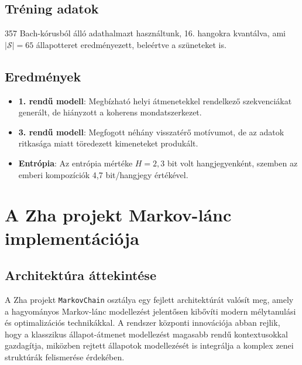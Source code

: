 \subsection{Tréning adatok}

357 Bach-kórusból álló adathalmazt használtunk, 16. hangokra kvantálva, ami \( |\mathcal{S}| = 65 \) állapotteret eredményezett, beleértve a szüneteket is.

\subsection{Eredmények}

\begin{itemize}
    \item \textbf{1. rendű modell}: Megbízható helyi átmenetekkel rendelkező szekvenciákat generált, de hiányzott a koherens mondatszerkezet.
    \item \textbf{3. rendű modell}: Megfogott néhány visszatérő motívumot, de az adatok ritkasága miatt töredezett kimeneteket produkált.
    \item \textbf{Entrópia}: Az entrópia mértéke \( H = 2,3 \) bit volt hangjegyenként, szemben az emberi kompozíciók 4,7 bit/hangjegy értékével.
\end{itemize}


\section{A Zha projekt Markov-lánc implementációja}

\subsection{Architektúra áttekintése}

A Zha projekt \texttt{MarkovChain} osztálya egy fejlett architektúrát valósít meg, amely a hagyományos Markov-lánc modellezést jelentősen kibővíti modern mélytanulási és optimalizációs technikákkal. A rendszer központi innovációja abban rejlik, hogy a klasszikus állapot-átmenet modellezést magasabb rendű kontextusokkal gazdagítja, miközben rejtett állapotok modellezését is integrálja a komplex zenei struktúrák felismerése érdekében.

